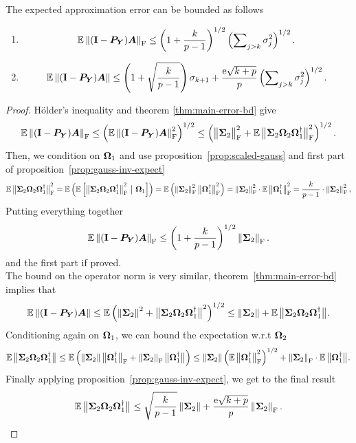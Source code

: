 \begin{theorem} \label{thm:avg-frob-error-gauss}
The expected approximation error can be bounded as follows
\begin{enumerate}
  \item
$$
\Expect \fnorm{(\Id - \mtx{P}_{\mtx{Y}}) \mtx{A}}
    \leq \left( 1 + \frac{k}{p-1} \right)^{1/2}
    \left( \sum\nolimits_{j>k} \sigma_j^2 \right)^{1/2}.
$$
\item 
$$
\Expect \norm{(\Id - \mtx{P}_{\mtx{Y}}) \mtx{A}}
    \leq \left(1 + \sqrt{\frac{k}{p-1}} \right) \sigma_{k+1}
        + \frac{\econst\sqrt{k+p}}{p}
        \left(\sum\nolimits_{j>k} \sigma_{j}^2 \right)^{1/2}.
$$
 \end{enumerate}
\end{theorem}
\begin{proof}
H{\"o}lder's inequality and theorem \ref{thm:main-error-bd} give 
$$
\Expect \fnorm{ (\Id - \mtx{P}_{\mtx{Y}}) \mtx{A}}
    \leq \left( \Expect \fnormsq{(\Id - \mtx{P}_{\mtx{Y}}) \mtx{A}} \right)^{1/2}
    \leq \left( \smnorm{\rm F}{\mtx{\Sigma}_2}^2 + \Expect \smnorm{\rm F}{ \mtx{\Sigma}_2
                \mtx{\Omega}_2 \mtx{\Omega}_1^\psinv }^2 \right)^{1/2}.
$$
Then, we condition on $\mtx{\Omega}_1$ and use proposition~\ref{prop:scaled-gauss}
and first part of proposition~\ref{prop:gauss-inv-expect}
$$
\Expect \smnorm{\rm F}{ \mtx{\Sigma}_2 \mtx{\Omega}_2 \mtx{\Omega}_1^\psinv }^2
    = \Expect \left( \Expect \left[ \smnorm{\rm F}{ \mtx{\Sigma}_2 \mtx{\Omega}_2
\mtx{\Omega}_1^\psinv }^2 \ \big\vert \ \mtx{\Omega}_1 \right] \right)
    = \Expect \left( \fnormsq{\mtx{\Sigma}_2} \smnorm{\rm F}{\mtx{\Omega}_1^\psinv}^2 \right)
    = \fnormsq{\mtx{\Sigma}_2} \cdot \Expect \smnorm{\rm F}{\mtx{\Omega}_1^\psinv}^2
    = \frac{k}{p-1} \cdot \fnormsq{\mtx{\Sigma}_2},
$$
Putting everything together
$$
\Expect \fnorm{ (\Id - \mtx{P}_{\mtx{Y}}) \mtx{A}}
    \leq \left(1 + \frac{k}{p-1}\right)^{1/2} \fnorm{ \mtx{\Sigma}_2 }.
$$
and the first part if proved. \\
The bound on the operator norm is very similar, theorem~\ref{thm:main-error-bd}
implies that
$$
\Expect \norm{ (\Id - \mtx{P}_{\mtx{Y}}) \mtx{A} }
    \leq \Expect \left( \normsq{\mtx{\Sigma}_2}
        + \smnorm{}{\mtx{\Sigma}_2 \mtx{\Omega}_2 \mtx{\Omega}_1^\psinv }^2 \right)^{1/2}
    \leq \norm{\mtx{\Sigma}_2} + \Expect \smnorm{}{ \mtx{\Sigma}_2 \mtx{\Omega}_2 \mtx{\Omega}_1^\psinv }.
$$
Conditioning again on $\mtx{\Omega}_1$, we can bound the expectation w.r.t
 $\mtx{\Omega}_2$
$$
\Expect \smnorm{}{ \mtx{\Sigma}_2 \mtx{\Omega}_2
\mtx{\Omega}_1^\psinv }
    \leq \Expect \left( \norm{\mtx{\Sigma}_2} \smnorm{\rm F}{\mtx{\Omega}_1^\psinv}
        + \fnorm{\mtx{\Sigma}_2} \smnorm{}{\mtx{\Omega}_1^\psinv} \right)
    \leq \norm{\mtx{\Sigma}_2} \left( \Expect \smnorm{\rm F}{\mtx{\Omega}_1^\psinv}^2 \right)^{1/2}
        + \fnorm{\mtx{\Sigma}_2} \cdot \Expect \smnorm{}{\mtx{\Omega}_1^\psinv}.
$$
Finally applying proposition~\ref{prop:gauss-inv-expect}, we get to the final
result
$$
\Expect \smnorm{}{ \mtx{\Sigma}_2 \mtx{\Omega}_2
\mtx{\Omega}_1^\psinv }
    \leq \sqrt{\frac{k}{p-1}} \norm{\mtx{\Sigma}_2}
    + \frac{\econst\sqrt{k+p}}{p} \fnorm{\mtx{\Sigma}_2}.
$$
\end{proof}

